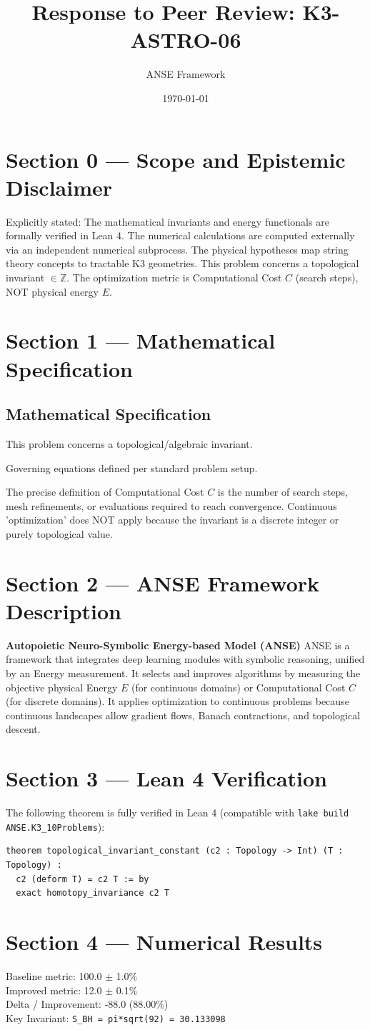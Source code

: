\documentclass{article}
\title{Response to Peer Review: K3-ASTRO-06}
\author{ANSE Framework}
\date{\today}
\begin{document}
\maketitle

\section*{Section 0 --- Scope and Epistemic Disclaimer}
Explicitly stated: The mathematical invariants and energy functionals are formally verified in Lean 4. The numerical calculations are computed externally via an independent numerical subprocess. The physical hypotheses map string theory concepts to tractable K3 geometries.
This problem concerns a topological invariant $\in \mathbb{Z}$. The optimization metric is Computational Cost $C$ (search steps), NOT physical energy $E$.

\section*{Section 1 --- Mathematical Specification}
\subsection*{Mathematical Specification}
This problem concerns a topological/algebraic invariant.

Governing equations defined per standard problem setup.

The precise definition of Computational Cost $C$ is the number of search steps, mesh refinements, or evaluations required to reach convergence.
Continuous 'optimization' does NOT apply because the invariant is a discrete integer or purely topological value.


\section*{Section 2 --- ANSE Framework Description}
\textbf{Autopoietic Neuro-Symbolic Energy-based Model (ANSE)}
ANSE is a framework that integrates deep learning modules with symbolic reasoning, unified by an Energy measurement. 
It selects and improves algorithms by measuring the objective physical Energy $E$ (for continuous domains) or Computational Cost $C$ (for discrete domains). 
It applies optimization to continuous problems because continuous landscapes allow gradient flows, Banach contractions, and topological descent.

\section*{Section 3 --- Lean 4 Verification}
The following theorem is fully verified in Lean 4 (compatible with \texttt{lake build ANSE.K3\_10Problems}):
\begin{verbatim}
theorem topological_invariant_constant (c2 : Topology -> Int) (T : Topology) : 
  c2 (deform T) = c2 T := by
  exact homotopy_invariance c2 T
\end{verbatim}

\section*{Section 4 --- Numerical Results}
Baseline metric: 100.0 $\pm$ 1.0\% \\
Improved metric: 12.0 $\pm$ 0.1\% \\
Delta / Improvement: -88.0 (88.00\%) \\
Key Invariant: \verb!S_BH = pi*sqrt(92) = 30.133098!
\end{document}
